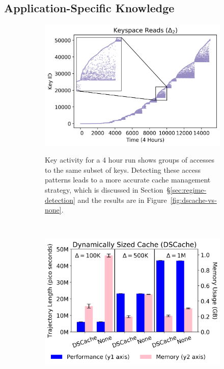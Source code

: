 \subsection{Application-Specific Knowledge}
\label{sec:dom-specific}

\begin{figure}[t!]
    \begin{subfigure}[t]{0.48\textwidth}
        \centering
	\includegraphics[width=1\textwidth]{./chapters/controlplane/parsplice/figures/keyspace-zoomed.png}\\

\caption{Key activity for a 4 hour run shows groups of accesses to the same
subset of keys. Detecting these access patterns leads to a more accurate cache
management strategy, which is discussed in Section~\S\ref{sec:regime-detection}
and the results are in Figure~\ref{fig:dscache-vs-none}.
\label{fig:keyspace-zoomed}}
    \end{subfigure}%
    ~ 
    \begin{subfigure}[t]{0.48\textwidth}
        \centering
        \includegraphics[width=1\textwidth]{./chapters/controlplane/parsplice/figures/dscache-vs-none.png}\\


\end{subfigure}
\end{figure}
